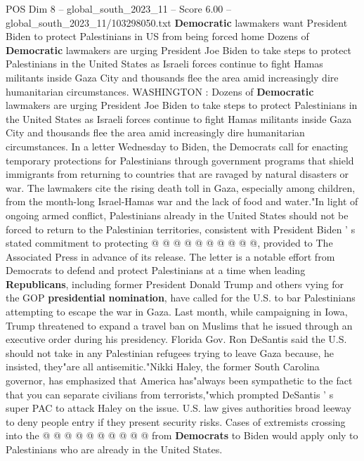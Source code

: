 \begin{textsample}{POS Dim 8 – global\_south\_2023\_11 – Score 6.00 – global\_south\_2023\_11/103298050.txt}  \label{ex:f8_pos_275}
\textbf{Democratic} lawmakers want President Biden to protect Palestinians in US from being forced home Dozens of \textbf{Democratic} lawmakers are urging President Joe Biden to take steps to protect Palestinians in the United States as Israeli forces continue to fight Hamas militants inside Gaza City and thousands flee the area amid increasingly dire humanitarian circumstances.
WASHINGTON : Dozens of \textbf{Democratic} lawmakers are urging President Joe Biden to take steps to protect Palestinians in the United States as Israeli forces continue to fight Hamas militants inside Gaza City and thousands flee the area amid increasingly dire humanitarian circumstances.
In a letter Wednesday to Biden, the Democrats call for enacting temporary protections for Palestinians through government programs that shield immigrants from returning to countries that are ravaged by natural disasters or war.
The lawmakers cite the rising death toll in Gaza, especially among children, from the month-long Israel-Hamas war and the lack of food and water."In light of ongoing armed conflict, Palestinians already in the United States should not be forced to return to the Palestinian territories, consistent with President Biden ' s stated commitment to protecting @ @ @ @ @ @ @ @ @ @, provided to The Associated Press in advance of its release.
The letter is a notable effort from Democrats to defend and protect Palestinians at a time when leading \textbf{Republicans}, including former President Donald Trump and others vying for the GOP \textbf{presidential} \textbf{nomination}, have called for the U.S. to bar Palestinians attempting to escape the war in Gaza.
Last month, while campaigning in Iowa, Trump threatened to expand a travel ban on Muslims that he issued through an executive order during his presidency.
Florida Gov.
Ron DeSantis said the U.S. should not take in any Palestinian refugees trying to leave Gaza because, he insisted, they"are all antisemitic."Nikki Haley, the former South Carolina governor, has emphasized that America has"always been sympathetic to the fact that you can separate civilians from terrorists,"which prompted DeSantis ' s super PAC to attack Haley on the issue.
U.S. law gives authorities broad leeway to deny people entry if they present security risks.
Cases of extremists crossing into the @ @ @ @ @ @ @ @ @ @ from \textbf{Democrats} to Biden would apply only to Palestinians who are already in the United States.

\end{textsample}
